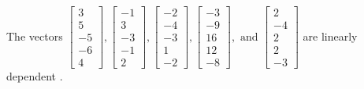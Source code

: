 \begin{exercise}
\begin{exerciseStatement}
  \end{exerciseStatement}
  \begin{exerciseAnswer}
   The vectors \(\left[\begin{array}{r}
3 \\
5 \\
-5 \\
-6 \\
4
\end{array}\right] , \left[\begin{array}{r}
-1 \\
3 \\
-3 \\
-1 \\
2
\end{array}\right] , \left[\begin{array}{r}
-2 \\
-4 \\
-3 \\
1 \\
-2
\end{array}\right] , \left[\begin{array}{r}
-3 \\
-9 \\
16 \\
12 \\
-8
\end{array}\right] , \text{ and } \left[\begin{array}{r}
2 \\
-4 \\
2 \\
2 \\
-3
\end{array}\right]\) are 
  	 linearly dependent  .
  


  \end{exerciseAnswer}
\end{exercise}